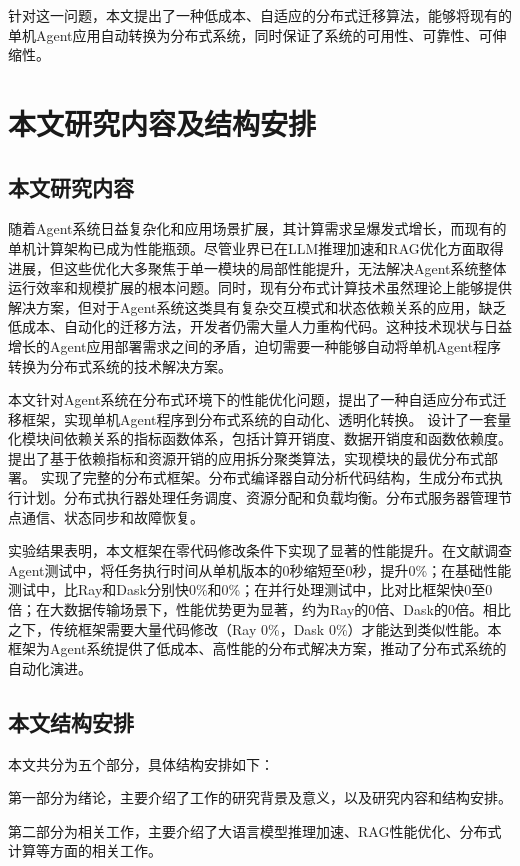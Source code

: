 针对这一问题，本文提出了一种低成本、自适应的分布式迁移算法，能够将现有的单机Agent应用自动转换为分布式系统，同时保证了系统的可用性、可靠性、可伸缩性。

\section{本文研究内容及结构安排}

\subsection{本文研究内容}

随着Agent系统日益复杂化和应用场景扩展，其计算需求呈爆发式增长，而现有的单机计算架构已成为性能瓶颈。尽管业界已在LLM推理加速和RAG优化方面取得进展，但这些优化大多聚焦于单一模块的局部性能提升，无法解决Agent系统整体运行效率和规模扩展的根本问题。同时，现有分布式计算技术虽然理论上能够提供解决方案，但对于Agent系统这类具有复杂交互模式和状态依赖关系的应用，缺乏低成本、自动化的迁移方法，开发者仍需大量人力重构代码。这种技术现状与日益增长的Agent应用部署需求之间的矛盾，迫切需要一种能够自动将单机Agent程序转换为分布式系统的技术解决方案。

本文针对Agent系统在分布式环境下的性能优化问题，提出了一种自适应分布式迁移框架，实现单机Agent程序到分布式系统的自动化、透明化转换。
设计了一套量化模块间依赖关系的指标函数体系，包括计算开销度、数据开销度和函数依赖度。
提出了基于依赖指标和资源开销的应用拆分聚类算法，实现模块的最优分布式部署。
实现了完整的分布式框架。分布式编译器自动分析代码结构，生成分布式执行计划。分布式执行器处理任务调度、资源分配和负载均衡。分布式服务器管理节点通信、状态同步和故障恢复。

实验结果表明，本文框架在零代码修改条件下实现了显著的性能提升。在文献调查Agent测试中，将任务执行时间从单机版本的0秒缩短至0秒，提升0\%；在基础性能测试中，比Ray和Dask分别快0\%和0\%；在并行处理测试中，比对比框架快0至0倍；在大数据传输场景下，性能优势更为显著，约为Ray的0倍、Dask的0倍。相比之下，传统框架需要大量代码修改（Ray 0\%，Dask 0\%）才能达到类似性能。本框架为Agent系统提供了低成本、高性能的分布式解决方案，推动了分布式系统的自动化演进。

\subsection{本文结构安排}
本文共分为五个部分，具体结构安排如下：

第一部分为绪论，主要介绍了工作的研究背景及意义，以及研究内容和结构安排。

第二部分为相关工作，主要介绍了大语言模型推理加速、RAG性能优化、分布式计算等方面的相关工作。

